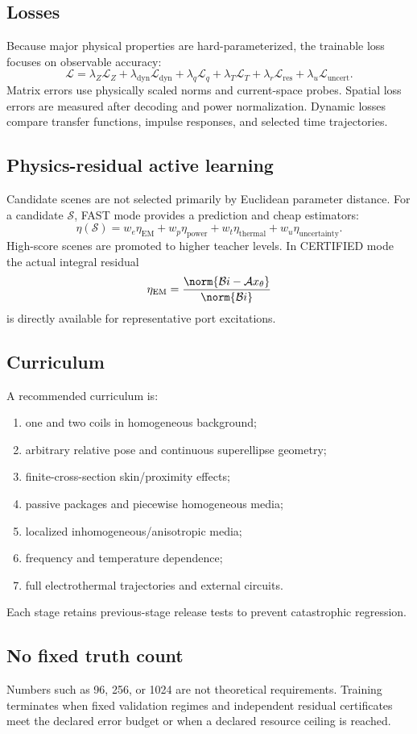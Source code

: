 \subsection{Losses}

Because major physical properties are hard-parameterized, the trainable loss
focuses on observable accuracy:
\[
 \mathcal L
 =
 \lambda_Z\mathcal L_Z
 +\lambda_{\mathrm{dyn}}\mathcal L_{\mathrm{dyn}}
 +\lambda_q\mathcal L_q
 +\lambda_T\mathcal L_T
 +\lambda_r\mathcal L_{\mathrm{res}}
 +\lambda_u\mathcal L_{\mathrm{uncert}}.
\]
Matrix errors use physically scaled norms and current-space probes. Spatial loss
errors are measured after decoding and power normalization. Dynamic losses
compare transfer functions, impulse responses, and selected time trajectories.

\subsection{Physics-residual active learning}

Candidate scenes are not selected primarily by Euclidean parameter distance.
For a candidate $\mathcal S$, FAST mode provides a prediction and cheap
estimators:
\[
 \eta(\mathcal S)
 =
 w_e\eta_{\mathrm{EM}}
 +w_p\eta_{\mathrm{power}}
 +w_t\eta_{\mathrm{thermal}}
 +w_u\eta_{\mathrm{uncertainty}}.
\]
High-score scenes are promoted to higher teacher levels. In CERTIFIED mode the
actual integral residual
\[
 \eta_{\mathrm{EM}}
 =
 \frac{\norm{\mathcal B i-\mathcal A x_\theta}}
      {\norm{\mathcal B i}}
\]
is directly available for representative port excitations.

\subsection{Curriculum}

A recommended curriculum is:
\begin{enumerate}
\item one and two coils in homogeneous background;
\item arbitrary relative pose and continuous superellipse geometry;
\item finite-cross-section skin/proximity effects;
\item passive packages and piecewise homogeneous media;
\item localized inhomogeneous/anisotropic media;
\item frequency and temperature dependence;
\item full electrothermal trajectories and external circuits.
\end{enumerate}
Each stage retains previous-stage release tests to prevent catastrophic
regression.

\subsection{No fixed truth count}

Numbers such as 96, 256, or 1024 are not theoretical requirements. Training
terminates when fixed validation regimes and independent residual certificates
meet the declared error budget or when a declared resource ceiling is reached.
